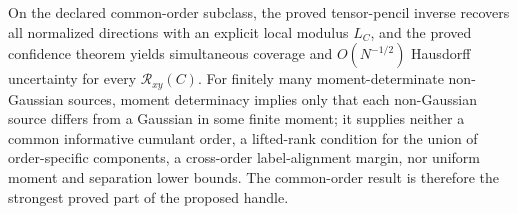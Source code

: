 On the declared common-order subclass, the proved tensor-pencil inverse recovers all normalized directions with an explicit local modulus \(L_C\), and the proved confidence theorem yields simultaneous coverage and \(O(N^{-1/2})\) Hausdorff uncertainty for every \(\mathcal R_{xy}(C)\). For finitely many moment-determinate non-Gaussian sources, moment determinacy implies only that each non-Gaussian source differs from a Gaussian in some finite moment; it supplies neither a common informative cumulant order, a lifted-rank condition for the union of order-specific components, a cross-order label-alignment margin, nor uniform moment and separation lower bounds. The common-order result is therefore the strongest proved part of the proposed handle.